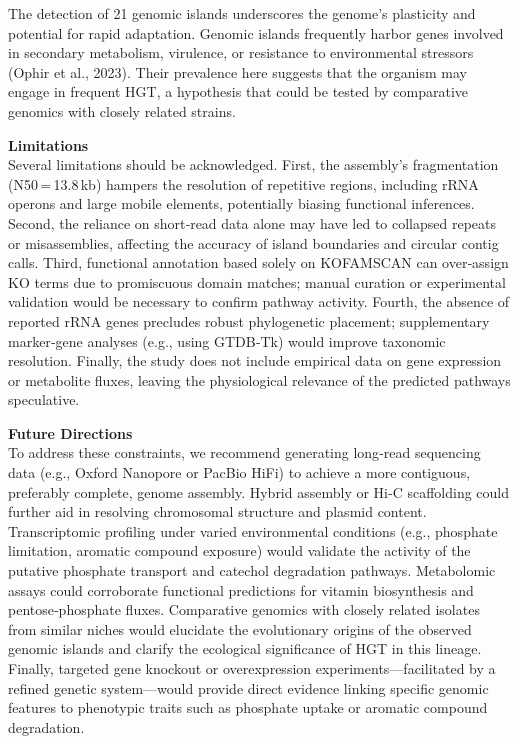 \documentclass[
  11pt,
]{article}
\begin{document}
The detection of 21 genomic islands underscores the genome's plasticity
and potential for rapid adaptation. Genomic islands frequently harbor
genes involved in secondary metabolism, virulence, or resistance to
environmental stressors (Ophir et al., 2023). Their prevalence here
suggests that the organism may engage in frequent HGT, a hypothesis that
could be tested by comparative genomics with closely related strains.

\textbf{Limitations}\\
Several limitations should be acknowledged. First, the assembly's
fragmentation (N50\,=\,13.8\,kb) hampers the resolution of repetitive
regions, including rRNA operons and large mobile elements, potentially
biasing functional inferences. Second, the reliance on short‑read data
alone may have led to collapsed repeats or misassemblies, affecting the
accuracy of island boundaries and circular contig calls. Third,
functional annotation based solely on KOFAMSCAN can over‑assign KO terms
due to promiscuous domain matches; manual curation or experimental
validation would be necessary to confirm pathway activity. Fourth, the
absence of reported rRNA genes precludes robust phylogenetic placement;
supplementary marker‑gene analyses (e.g., using GTDB‑Tk) would improve
taxonomic resolution. Finally, the study does not include empirical data
on gene expression or metabolite fluxes, leaving the physiological
relevance of the predicted pathways speculative.

\textbf{Future Directions}\\
To address these constraints, we recommend generating long‑read
sequencing data (e.g., Oxford Nanopore or PacBio HiFi) to achieve a more
contiguous, preferably complete, genome assembly. Hybrid assembly or
Hi‑C scaffolding could further aid in resolving chromosomal structure
and plasmid content. Transcriptomic profiling under varied environmental
conditions (e.g., phosphate limitation, aromatic compound exposure)
would validate the activity of the putative phosphate transport and
catechol degradation pathways. Metabolomic assays could corroborate
functional predictions for vitamin biosynthesis and pentose‑phosphate
fluxes. Comparative genomics with closely related isolates from similar
niches would elucidate the evolutionary origins of the observed genomic
islands and clarify the ecological significance of HGT in this lineage.
Finally, targeted gene knockout or overexpression
experiments---facilitated by a refined genetic system---would provide
direct evidence linking specific genomic features to phenotypic traits
such as phosphate uptake or aromatic compound degradation.
\end{document}
